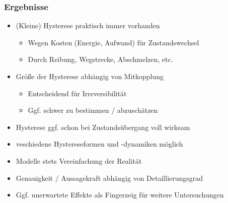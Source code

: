 \documentclass{beamer}
\begin{document}
\begin{frame}
  \frametitle{Ergebnisse}
  \begin{itemize}
    \item<2->  (Kleine) Hysterese praktisch immer
      vorhanden
      \begin{itemize}
      \item<3->  Wegen \glqq{}Kosten\grqq{} (Energie,
        Aufwand) für Zustandswechsel
      \item<4->  Durch Reibung, Wegstrecke,
        Abschmelzen, etc.
      \end{itemize}
    \item<5->  Größe der Hysterese abhängig von Mitkopplung
      \begin{itemize}
      \item<6->  Entscheidend für Irreversibilität
      \item<7->  Ggf. schwer zu bestimmen / abzuschätzen
      \end{itemize}
    \item<8->  Hysterese ggf. schon bei Zustandsübergang voll wirksam
    \item<9->  veschiedene Hystereseformen und -dynamiken möglich
    \item<10->  Modelle stets Vereinfachung der Realität
    \item<11->  Genauigkeit / Aussagekraft abhängig von Detaillierungsgrad
    \item<12->  Ggf. unerwartete Effekte als Fingerzeig für weitere Untersuchungen
  \end{itemize}
\end{frame}
\end{document}
